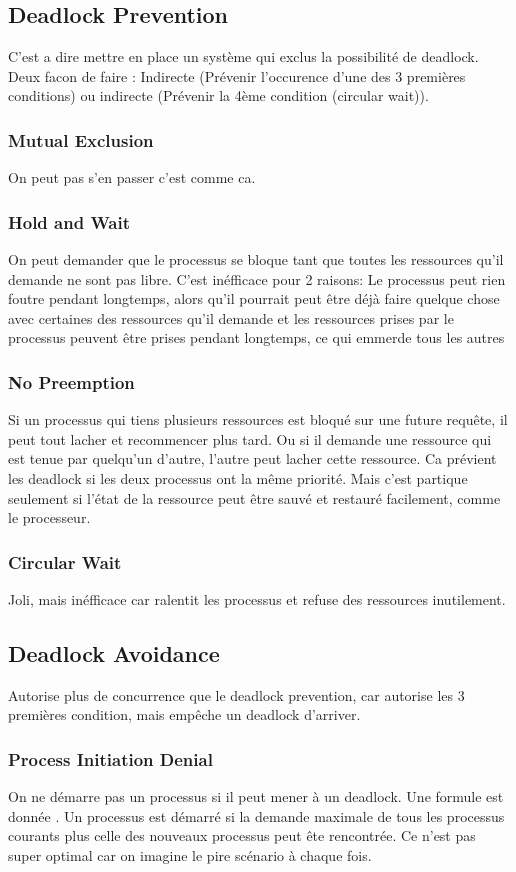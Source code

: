 \subsection{Deadlock Prevention}
C'est a dire mettre en place un système qui exclus la possibilité de deadlock. Deux facon de faire : Indirecte (Prévenir l'occurence d'une des 3 premières conditions) ou indirecte (Prévenir la 4ème condition (circular wait)).
\subsubsection{Mutual Exclusion}
On peut pas s'en passer c'est comme ca.
\subsubsection{Hold and Wait}
On peut demander que le processus se bloque tant que toutes les ressources qu'il demande ne sont pas libre. C'est inéfficace pour 2 raisons: Le processus peut rien foutre pendant longtemps, alors qu'il pourrait peut être déjà faire quelque chose avec certaines des ressources qu'il demande et les ressources prises par le processus peuvent être prises pendant longtemps, ce qui emmerde tous les autres
\subsubsection{No Preemption}
Si un processus qui tiens plusieurs ressources est bloqué sur une future requête, il peut tout lacher et recommencer plus tard. Ou si il demande une ressource qui est tenue par quelqu'un d'autre, l'autre peut lacher cette ressource. Ca prévient les deadlock si les deux processus ont la même priorité. Mais c'est partique seulement si l'état de la ressource peut être sauvé et restauré facilement, comme le processeur.
\subsubsection{Circular Wait}
Joli, mais inéfficace car ralentit les processus et refuse des ressources inutilement.
\subsection{Deadlock Avoidance}
Autorise plus de concurrence que le deadlock prevention, car autorise les 3 premières condition, mais empêche un deadlock d'arriver.
\subsubsection{Process Initiation Denial}
On ne démarre pas un processus si il peut mener à un deadlock. Une formule est donnée \cite[p.~271]{stallings}. Un processus est démarré si la demande maximale de tous les processus courants plus celle des nouveaux processus peut ête rencontrée. Ce n'est pas super optimal car on imagine le pire scénario à chaque fois.
